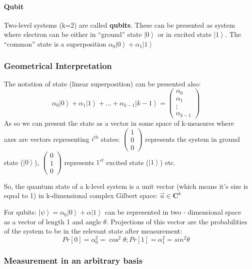 \documentclass{scrartcl}
\newcommand{\ket}[1]{\left| #1 \right>} %
\begin{document}
\paragraph{Qubit}

Two-level systems (k=2) are called {\bf qubits}. These can be presented as
system where electron can be either in ``ground'' state $\ket0$ or in excited
state $\ket1$. The ``common'' state is a superposition $\alpha_0 \ket0 +
\alpha_1 \ket1$

\subsubsection{Geometrical Interpretation}
\label{sec:2-2}

The notation of state (linear superposition) can be presented also:
\[\alpha_0 \ket0 + \alpha_1 \ket1 + \dots +
\alpha_{k-1} \ket{k-1} = \begin{pmatrix} \alpha_0 \\ \alpha_1 \\ \vdots \\
  \alpha_{k-1} \end{pmatrix}\] As so we can present the state as a vector in
some space of k-measures where axes are vectors representing $i^{th}$ states:
$\begin{pmatrix} 1 \\ 0 \\ 0 \end{pmatrix}$ represents the system in ground
state ($\ket0$), $\begin{pmatrix} 0 \\ 1 \\ 0 \end{pmatrix}$ represents $1^{st}$
excited state ($\ket1$) etc.

So, the quantum state of a k-level system is a unit vector (which means it's
size is equal to 1) in k-dimensional complex Gilbert space: $\vec u \in
\mathbf{C}^k$

For qubits: $\ket\psi = \alpha_0 \ket0 + \alpha \ket1$ can be represented in two
- dimensional space as a vector of length 1 and angle $\theta$. Projections of
this vector are the probabilities of the system to be in the relevant state
after measurement:
\[ Pr[0] = \alpha_0^2 = \cos^2 \theta; Pr[1] = \alpha_1^2 = sin^2 \theta\]

\subsubsection{Measurement in an arbitrary basis}
\label{sec:2-3}
\end{document}
